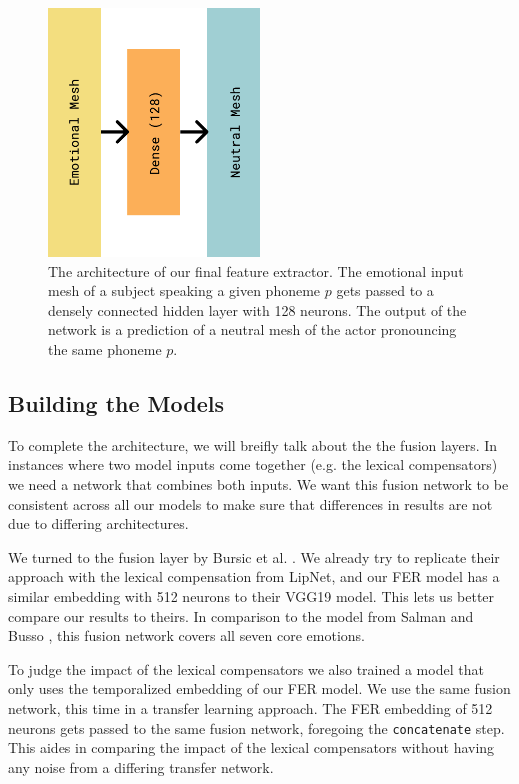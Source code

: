 \begin{figure}
    \centering
    \includegraphics[width=0.5\textwidth]{res/FExtractor.pdf}
    \caption{The architecture of our final feature extractor. The emotional input mesh of a subject speaking a given phoneme $p$ gets passed to a densely connected hidden layer with 128 neurons. The output of the network is a prediction of a neutral mesh of the actor pronouncing the same phoneme $p$.}
    \label{fig:fextractor}
\end{figure}

\subsection{Building the Models}

To complete the architecture, we will breifly talk about the the fusion layers. In instances where two model inputs come together (e.g. the lexical compensators) we need a network that combines both inputs. We want this fusion network to be consistent across all our models to make sure that differences in results are not due to differing architectures.

We turned to the fusion layer by Bursic et al. \cite{bursic2020improving}. We already try to replicate their approach with the lexical compensation from LipNet, and our FER model has a similar embedding with 512 neurons to their VGG19 model. This lets us better compare our results to theirs. In comparison to the model from Salman and Busso \cite{salman2020style}, this fusion network covers all seven core emotions.

To judge the impact of the lexical compensators we also trained a model that only uses the temporalized embedding of our FER model. We use the same fusion network, this time in a transfer learning approach. The FER embedding of 512 neurons gets passed to the same fusion network, foregoing the \texttt{concatenate} step. This aides in comparing the impact of the lexical compensators without having any noise from a differing transfer network.

